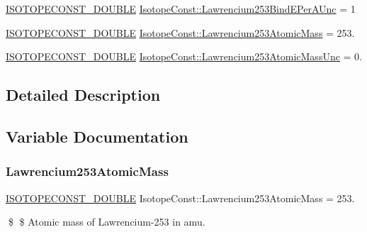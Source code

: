 \begin{DoxyCompactItemize}
\mbox{\hyperlink{group___isotope_const-_macros_ga8f45a7272ce02c0b4c65c44636ed719a}{I\+S\+O\+T\+O\+P\+E\+C\+O\+N\+S\+T\+\_\+\+D\+O\+U\+B\+LE}} \mbox{\hyperlink{group___isotope_const-_lawrencium-_lr253_gaf790bbf0e08e3c4f05622c6e9a0a68a3}{Isotope\+Const\+::\+Lawrencium253\+Bind\+E\+Per\+A\+Unc}} = 1
\item 
\mbox{\hyperlink{group___isotope_const-_macros_ga8f45a7272ce02c0b4c65c44636ed719a}{I\+S\+O\+T\+O\+P\+E\+C\+O\+N\+S\+T\+\_\+\+D\+O\+U\+B\+LE}} \mbox{\hyperlink{group___isotope_const-_lawrencium-_lr253_gab63c871c48f6e37a13cc425858e9bb27}{Isotope\+Const\+::\+Lawrencium253\+Atomic\+Mass}} = 253.
\item 
\mbox{\hyperlink{group___isotope_const-_macros_ga8f45a7272ce02c0b4c65c44636ed719a}{I\+S\+O\+T\+O\+P\+E\+C\+O\+N\+S\+T\+\_\+\+D\+O\+U\+B\+LE}} \mbox{\hyperlink{group___isotope_const-_lawrencium-_lr253_gaa749474ef5347a71d9f397e06f79e620}{Isotope\+Const\+::\+Lawrencium253\+Atomic\+Mass\+Unc}} = 0.
\end{DoxyCompactItemize}


\subsection{Detailed Description}


\subsection{Variable Documentation}
\mbox{\label{group___isotope_const-_lawrencium-_lr253_gab63c871c48f6e37a13cc425858e9bb27}} 
\subsubsection{\texorpdfstring{Lawrencium253\+Atomic\+Mass}{Lawrencium253AtomicMass}}
{\footnotesize\ttfamily \mbox{\hyperlink{group___isotope_const-_macros_ga8f45a7272ce02c0b4c65c44636ed719a}{I\+S\+O\+T\+O\+P\+E\+C\+O\+N\+S\+T\+\_\+\+D\+O\+U\+B\+LE}} Isotope\+Const\+::\+Lawrencium253\+Atomic\+Mass = 253.}

\$ \$ Atomic mass of Lawrencium-\/253 in amu. \mbox{\label{group___isotope_const-_lawrencium-_lr253_gaa749474ef5347a71d9f397e06f79e620}} 
